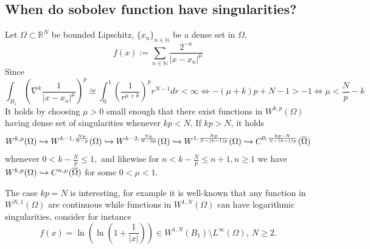 \documentclass[12pt,a4paper]{article}
\renewcommand\:{\colon}
\begin{document}
\subsection{When do sobolev function have singularities?}
Let $\Omega\subset \mathbb{R}^N$ be bounded Lipschitz, $\{x_n\}_{n\in \mathbb{N}}$ be a dense set in $\Omega,$
\begin{equation*}
	f(x):= \sum_{n\in \mathbb{N}}\frac{2^{-n}}{|x-x_n|^\mu}
\end{equation*}
Since
\begin{equation*}
	\int_{B_1}\left(\nabla^k \frac{1}{|x-x_n|^\mu}\right)^p \cong \int_0^1 \left(\frac{1}{r^{\mu+k}}\right)^pr^{N-1}dr < \infty \iff -(\mu+k)p+N-1>-1 \iff \mu<\frac{N}{p}-k
\end{equation*}
It holds by choosing $\mu>0$ small enough that there exist functions in $W^{k,p}(\Omega)$ having dense set of singularities whenever $kp<N$.
If $kp>N$, it holds
\begin{equation*}
W^{k,p}(\Omega)\xhookrightarrow{}W^{k-1,\frac{Np}{N-p}}(\Omega)\xhookrightarrow{}W^{k-2,\frac{Np}{N-2p}}(\Omega)\xhookrightarrow{}W^{1,\frac{Np}{N-(k-1)p}}(\Omega)\xhookrightarrow{}C^{0,\frac{kp-N}{N-(k-1)p}}(\overline{\Omega})
\end{equation*}
whenever $0<k-\frac{N}{p}\leq 1,$ and likewise for $n<k-\frac{N}{p}\leq n+1, n\geq 1$ we have $W^{k,p}(\Omega)\xhookrightarrow{}C^{n,\mu}(\overline{\Omega})$ for some $0<\mu<1.$ 
\par The case $kp=N$ is interesting, for example it is well-known that any function in $W^{N,1}(\Omega)$ are continuous while functions in $W^{1,N}(\Omega)$ can have logarithmic singularities, consider for instance
\begin{equation*}
	f(x)=\ln \left(\ln \left(1+\frac{1}{|x|}\right)\right)\in W^{1,N}(B_1)\setminus L^\infty(\Omega),\ N\geq 2.
\end{equation*}
\end{document}
